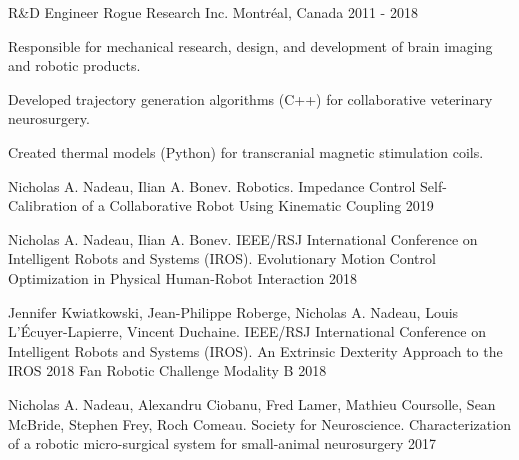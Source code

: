 \documentclass[11pt, letterpaper]{awesome-cv}
\begin{document}
\begin{cventries}
\cventry
{R&D Engineer}
{Rogue Research Inc.}
{Montréal, Canada}
{2011 - 2018}
{
\begin{cvitems} 
\item{Responsible for mechanical research, design, and development of brain imaging and robotic products.}
\item{Developed trajectory generation algorithms (C++) for collaborative veterinary neurosurgery.}
\item{Created thermal models (Python) for transcranial magnetic stimulation coils.}
\end{cvitems}
}

\end{cventries}


\begin{cventries}
\end{cventries}

\begin{cventries}

\cventry
{Nicholas A. Nadeau, Ilian A. Bonev. Robotics.}
{Impedance Control Self-Calibration of a Collaborative Robot Using Kinematic Coupling }
{}
{2019}
{}

\cventry
{Nicholas A. Nadeau, Ilian A. Bonev. IEEE/RSJ International Conference on Intelligent Robots and Systems (IROS).}
{Evolutionary Motion Control Optimization in Physical Human-Robot Interaction}
{}
{2018}
{}

\cventry
{Jennifer Kwiatkowski, Jean-Philippe Roberge, Nicholas A. Nadeau, Louis L'Écuyer-Lapierre, Vincent Duchaine. IEEE/RSJ International Conference on Intelligent Robots and Systems (IROS).}
{An Extrinsic Dexterity Approach to the IROS 2018 Fan Robotic Challenge Modality B}
{}
{2018}
{}

\cventry
{Nicholas A. Nadeau, Alexandru Ciobanu, Fred Lamer, Mathieu Coursolle, Sean McBride, Stephen Frey, Roch Comeau. Society for Neuroscience.}
{Characterization of a robotic micro-surgical system for small-animal neurosurgery}
{}
{2017}
{}

\end{cventries}
\end{document}
